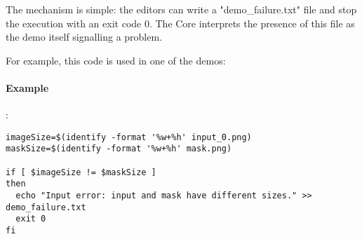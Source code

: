 The mechanism is simple: the editors can write a "demo\_failure.txt" file and stop the execution with an exit
code 0. The Core interprets the presence of this file as the demo itself signalling a problem.

For example, this code is used in one of the demos:
\paragraph{Example}:\\
\begin{verbatim}
imageSize=$(identify -format '%w+%h' input_0.png)
maskSize=$(identify -format '%w+%h' mask.png)

if [ $imageSize != $maskSize ]
then
  echo "Input error: input and mask have different sizes." >> demo_failure.txt
  exit 0
fi
\end{verbatim} 
